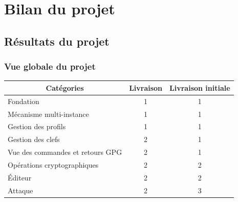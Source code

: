 \section{Bilan du projet}
  
  \subsection{Résultats du projet}
  \begin{frame}
    \frametitle{\color{white}Vue globale du projet}
  \begin{tabular}{|l|l|l|}
    \hline
    \multicolumn{1}{|c|}{\cellcolor{gray} \color{white}Catégories} & \multicolumn{1}{|c|}{\cellcolor{gray} \color{white}Livraison} & \multicolumn{1}{|c|}{\cellcolor{gray} \color{white}Livraison initiale} \\
    \hline
    \cellcolor{white}\color{green}Fondation & \multicolumn{1}{|c|}{\cellcolor{white}\color{black}1} & \multicolumn{1}{|c|}{\cellcolor{white}\color{black}1} \\
    \hline
    \cellcolor{white}\color{green}Mécanisme multi-instance & \multicolumn{1}{|c|}{\cellcolor{white}\color{black}1} & \multicolumn{1}{|c|}{\cellcolor{white}\color{black}1} \\    
    \hline
    \cellcolor{white}\color{green}Gestion des profils & \multicolumn{1}{|c|}{\cellcolor{white}\color{black}1} & \multicolumn{1}{|c|}{\cellcolor{white}\color{black}1} \\
    \hline
    \cellcolor{white}\color{yellow}Gestion des clefs & \multicolumn{1}{|c|}{\cellcolor{white}\color{black}2} & \multicolumn{1}{|c|}{\cellcolor{white}\color{black}1} \\
    \hline
    \cellcolor{white}\color{green}Vue des commandes et retours GPG & \multicolumn{1}{|c|}{\cellcolor{white}\color{black}2} & \multicolumn{1}{|c|}{\cellcolor{white}\color{black}1} \\
    \hline
    \cellcolor{white}\color{yellow}Opérations cryptographiques & \multicolumn{1}{|c|}{\cellcolor{white}\color{black}2} & \multicolumn{1}{|c|}{\cellcolor{white}\color{black}2} \\
    \hline
    \cellcolor{white}\color{yellow}\'{E}diteur & \multicolumn{1}{|c|}{\cellcolor{white}\color{black}2} & \multicolumn{1}{|c|}{\cellcolor{white}\color{black}2} \\
    \hline
    \cellcolor{white}\color{red}Attaque & \multicolumn{1}{|c|}{\cellcolor{white}\color{black}2} & \multicolumn{1}{|c|}{\cellcolor{white}\color{black}3} \\

\end{tabular}
\end{frame}
